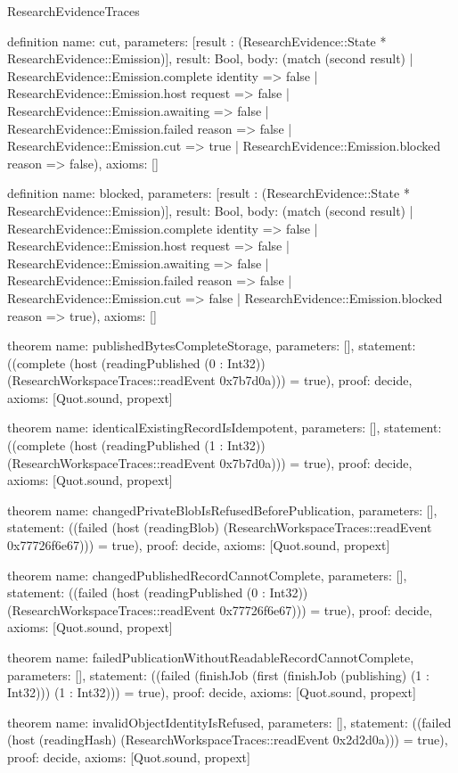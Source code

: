 \begin{lexlean}{ResearchEvidenceTraces}
\begin{semanticmodule}
definition{
 name: cut,
 parameters: [result : (ResearchEvidence::State * ResearchEvidence::Emission)],
 result: Bool,
 body: (match (second result) | ResearchEvidence::Emission.complete identity => false | ResearchEvidence::Emission.host request => false | ResearchEvidence::Emission.awaiting => false | ResearchEvidence::Emission.failed reason => false | ResearchEvidence::Emission.cut => true | ResearchEvidence::Emission.blocked reason => false),
 axioms: []
}

definition{
 name: blocked,
 parameters: [result : (ResearchEvidence::State * ResearchEvidence::Emission)],
 result: Bool,
 body: (match (second result) | ResearchEvidence::Emission.complete identity => false | ResearchEvidence::Emission.host request => false | ResearchEvidence::Emission.awaiting => false | ResearchEvidence::Emission.failed reason => false | ResearchEvidence::Emission.cut => false | ResearchEvidence::Emission.blocked reason => true),
 axioms: []
}

theorem{
 name: publishedBytesCompleteStorage,
 parameters: [],
 statement: ((complete (host (readingPublished (0 : Int32)) (ResearchWorkspaceTraces::readEvent 0x7b7d0a))) = true),
 proof: decide{},
 axioms: [Quot.sound, propext]
}

theorem{
 name: identicalExistingRecordIsIdempotent,
 parameters: [],
 statement: ((complete (host (readingPublished (1 : Int32)) (ResearchWorkspaceTraces::readEvent 0x7b7d0a))) = true),
 proof: decide{},
 axioms: [Quot.sound, propext]
}

theorem{
 name: changedPrivateBlobIsRefusedBeforePublication,
 parameters: [],
 statement: ((failed (host (readingBlob) (ResearchWorkspaceTraces::readEvent 0x77726f6e67))) = true),
 proof: decide{},
 axioms: [Quot.sound, propext]
}

theorem{
 name: changedPublishedRecordCannotComplete,
 parameters: [],
 statement: ((failed (host (readingPublished (0 : Int32)) (ResearchWorkspaceTraces::readEvent 0x77726f6e67))) = true),
 proof: decide{},
 axioms: [Quot.sound, propext]
}

theorem{
 name: failedPublicationWithoutReadableRecordCannotComplete,
 parameters: [],
 statement: ((failed (finishJob (first (finishJob (publishing) (1 : Int32))) (1 : Int32))) = true),
 proof: decide{},
 axioms: [Quot.sound, propext]
}

theorem{
 name: invalidObjectIdentityIsRefused,
 parameters: [],
 statement: ((failed (host (readingHash) (ResearchWorkspaceTraces::readEvent 0x2d2d0a))) = true),
 proof: decide{},
 axioms: [Quot.sound, propext]
}


\end{semanticmodule}
\end{lexlean}
